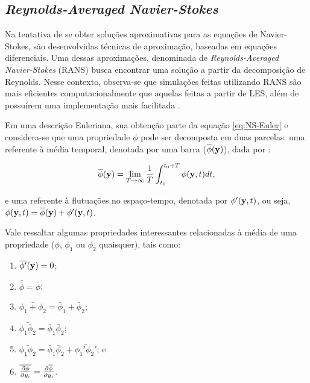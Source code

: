 \documentclass[_ArquivoPrincipal.tex]{subfiles}
\begin{document}
\subsection{\textit{Reynolds-Averaged Navier-Stokes}} \label{RANS}

Na tentativa de se obter soluções aproximativas para as equações de Navier-Stokes, são desenvolvidas técnicas de aproximação, baseadas em equações diferenciais. Uma dessas aproximações, denominada de \textit{Reynolds-Averaged Navier-Stokes} (RANS) busca encontrar uma solução a partir da decomposição de Reynolds. Nesse contexto, observa-se que simulações feitas utilizando RANS são mais eficientes computacionalmente que aquelas feitas a partir de LES, além de possuírem uma implementação mais facilitada \cite{alfonsi2009reynolds, ling2015evaluation}.

Em uma descrição Euleriana, sua obtenção parte da equação \ref{eq:NS-Euler} e considera-se que uma propriedade $\phi$ pode ser decomposta em duas parcelas: uma referente à média temporal, denotada por uma barra ($\overline{\phi}(\mathbf{y})$), dada por \cite{tennekes1972first,speziale1991analytical}:

\begin{equation}
    \overline{\phi}(\mathbf{y})=\lim_{T\to\infty}{\frac{1}{T}\int_{t_0}^{t_0+T}{\phi(\mathbf{y},t)dt}}\text{,}
\end{equation}

\noindent e uma referente à flutuações no espaço-tempo, denotada por $\phi'(\mathbf{y},t)$, ou seja, $\phi(\mathbf{y},t)=\overline{\phi}(\mathbf{y})+\phi'(\mathbf{y},t)$.

Vale ressaltar algumas propriedades interessantes relacionadas à média de uma propriedade ($\phi$, $\phi_1$ ou $\phi_2$ quaisquer), tais como:

\begin{enumerate}[label=\alph*.]
    \item $\overline{\phi'}(\mathbf{y})=0$;
    \item $\bar{\bar{\phi}}=\bar{\phi}$;
    \item $\bar{\phi_1+\phi_2}=\bar{\phi}_1+\bar{\phi}_2$;
    \item $\bar{\phi_1\bar{\phi}_2}=\bar{\phi}_1\bar{\phi}_2$;
    \item $\bar{\phi_1\phi_2}=\bar{\phi}_1\bar{\phi}_2+\bar{\phi_1'\phi_2'}$; e
    \item $\overline{\frac{\partial{\phi}}{\partial{y_i}}}=\frac{\partial{\overline{\phi}}}{\partial{y_i}}$.
\end{enumerate}
\end{document}
